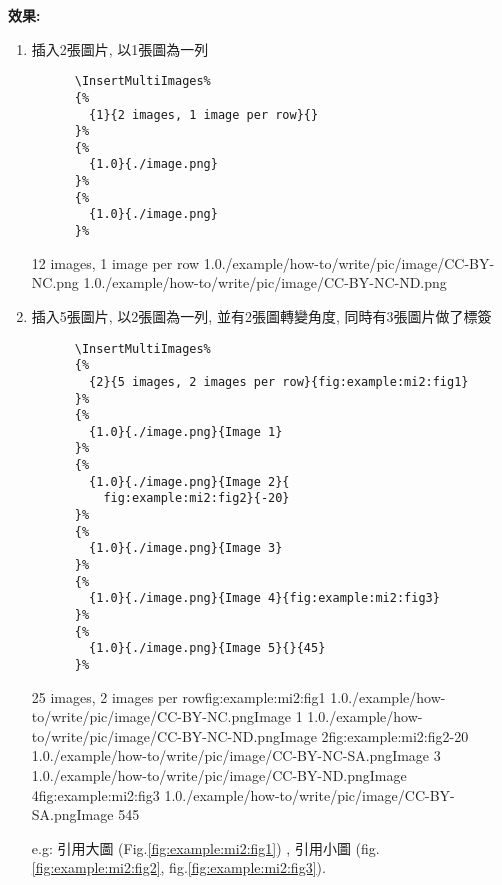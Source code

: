   \newpage

  {\bf 效果:}
  \begin{enumerate}
    \item
    {
      插入2張圖片, 以1張圖為一列
      \begin{verbatim}
      \InsertMultiImages%
      {%
        {1}{2 images, 1 image per row}{}
      }%
      {%
        {1.0}{./image.png}
      }%
      {%
        {1.0}{./image.png}
      }%
      \end{verbatim}
      \InsertMultiImages%
      {%
        {1}{2 images, 1 image per row}{}
      }%
      {%
        {1.0}{./example/how-to/write/pic/image/CC-BY-NC.png}
      }%
      {%
        {1.0}{./example/how-to/write/pic/image/CC-BY-NC-ND.png}
      }%
    } %

    \newpage

    \item
    {
      插入5張圖片, 以2張圖為一列, 並有2張圖轉變角度, 同時有3張圖片做了標簽
      \begin{verbatim}
      \InsertMultiImages%
      {%
        {2}{5 images, 2 images per row}{fig:example:mi2:fig1}
      }%
      {%
        {1.0}{./image.png}{Image 1}
      }%
      {%
        {1.0}{./image.png}{Image 2}{
          fig:example:mi2:fig2}{-20}
      }%
      {%
        {1.0}{./image.png}{Image 3}
      }%
      {%
        {1.0}{./image.png}{Image 4}{fig:example:mi2:fig3}
      }%
      {%
        {1.0}{./image.png}{Image 5}{}{45}
      }%
      \end{verbatim}
      \InsertMultiImages%
      {%
        {2}{5 images, 2 images per row}{fig:example:mi2:fig1}
      }%
      {%
        {1.0}{./example/how-to/write/pic/image/CC-BY-NC.png}{Image 1}
      }%
      {%
        {1.0}{./example/how-to/write/pic/image/CC-BY-NC-ND.png}{Image 2}{fig:example:mi2:fig2}{-20}
      }%
      {%
        {1.0}{./example/how-to/write/pic/image/CC-BY-NC-SA.png}{Image 3}
      }%
      {%
        {1.0}{./example/how-to/write/pic/image/CC-BY-ND.png}{Image 4}{fig:example:mi2:fig3}
      }%
      {%
        {1.0}{./example/how-to/write/pic/image/CC-BY-SA.png}{Image 5}{}{45}
      }%
    } %

      e.g: 
      引用大圖 (Fig.\ref{fig:example:mi2:fig1}) ,
      引用小圖 (fig.\ref{fig:example:mi2:fig2}, fig.\ref{fig:example:mi2:fig3}).
  \end{enumerate}

\EndChapter
